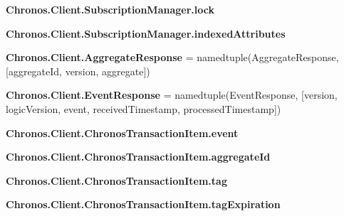 \begin{DoxyCompactItemize}
\item 
{\bfseries Chronos.\+Client.\+Subscription\+Manager.\+lock}\hypertarget{group__Chronos_gaa6b7c8903aa4b2dffa2272060d506187}{}\label{group__Chronos_gaa6b7c8903aa4b2dffa2272060d506187}

\item 
{\bfseries Chronos.\+Client.\+Subscription\+Manager.\+indexed\+Attributes}\hypertarget{group__Chronos_ga360f8a16cf30e5f550f142858f2f3b0a}{}\label{group__Chronos_ga360f8a16cf30e5f550f142858f2f3b0a}

\item 
{\bfseries Chronos.\+Client.\+Aggregate\+Response} = namedtuple(\textquotesingle{}Aggregate\+Response\textquotesingle{}, \mbox{[}\textquotesingle{}aggregate\+Id\textquotesingle{}, \textquotesingle{}version\textquotesingle{}, \textquotesingle{}aggregate\textquotesingle{}\mbox{]})\hypertarget{group__Chronos_ga8df2738cda3f71ade4fbf93dd77509f7}{}\label{group__Chronos_ga8df2738cda3f71ade4fbf93dd77509f7}

\item 
{\bfseries Chronos.\+Client.\+Event\+Response} = namedtuple(\textquotesingle{}Event\+Response\textquotesingle{}, \mbox{[}\textquotesingle{}version\textquotesingle{}, \textquotesingle{}logic\+Version\textquotesingle{}, \textquotesingle{}event\textquotesingle{}, \textquotesingle{}received\+Timestamp\textquotesingle{}, \textquotesingle{}processed\+Timestamp\textquotesingle{}\mbox{]})\hypertarget{group__Chronos_ga9b5ad71a3565b585cfbc9d1140dfe431}{}\label{group__Chronos_ga9b5ad71a3565b585cfbc9d1140dfe431}

\item 
{\bfseries Chronos.\+Client.\+Chronos\+Transaction\+Item.\+event}\hypertarget{group__Chronos_ga8f46f94cf23b1ce0b2dedf731ca3c803}{}\label{group__Chronos_ga8f46f94cf23b1ce0b2dedf731ca3c803}

\item 
{\bfseries Chronos.\+Client.\+Chronos\+Transaction\+Item.\+aggregate\+Id}\hypertarget{group__Chronos_gabbb7b2be6def2b652cc7a068ab4631e6}{}\label{group__Chronos_gabbb7b2be6def2b652cc7a068ab4631e6}

\item 
{\bfseries Chronos.\+Client.\+Chronos\+Transaction\+Item.\+tag}\hypertarget{group__Chronos_gae506a74f8fdc1c9debd2a843ed10ac8f}{}\label{group__Chronos_gae506a74f8fdc1c9debd2a843ed10ac8f}

\item 
{\bfseries Chronos.\+Client.\+Chronos\+Transaction\+Item.\+tag\+Expiration}\hypertarget{group__Chronos_ga023929f7c8fbc814d65512378bd84589}{}\label{group__Chronos_ga023929f7c8fbc814d65512378bd84589}


\end{DoxyCompactItemize}
